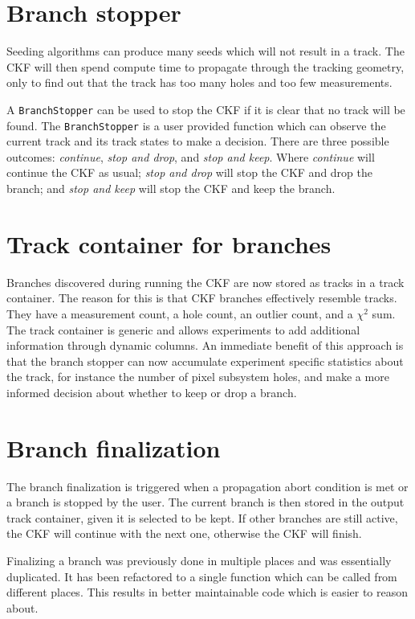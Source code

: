 \section{Branch stopper}

Seeding algorithms can produce many seeds which will not result in a track. The CKF will then spend compute time to propagate through the tracking geometry, only to find out that the track has too many holes and too few measurements.

A \texttt{BranchStopper} can be used to stop the CKF if it is clear that no track will be found. The \texttt{BranchStopper} is a user provided function which can observe the current track and its track states to make a decision. There are three possible outcomes: \textit{continue}, \textit{stop and drop}, and \textit{stop and keep}. Where \textit{continue} will continue the CKF as usual; \textit{stop and drop} will stop the CKF and drop the branch; and \textit{stop and keep} will stop the CKF and keep the branch.

\section{Track container for branches}

Branches discovered during running the CKF are now stored as tracks in a track container. The reason for this is that CKF branches effectively resemble tracks. They have a measurement count, a hole count, an outlier count, and a $\chi^2$ sum. The track container is generic and allows experiments to add additional information through dynamic columns. An immediate benefit of this approach is that the branch stopper can now accumulate experiment specific statistics about the track, for instance the number of pixel subsystem holes, and make a more informed decision about whether to keep or drop a branch.

\section{Branch finalization}

The branch finalization is triggered when a propagation abort condition is met or a branch is stopped by the user. The current branch is then stored in the output track container, given it is selected to be kept. If other branches are still active, the CKF will continue with the next one, otherwise the CKF will finish.

Finalizing a branch was previously done in multiple places and was essentially duplicated. It has been refactored to a single function which can be called from different places. This results in better maintainable code which is easier to reason about.

